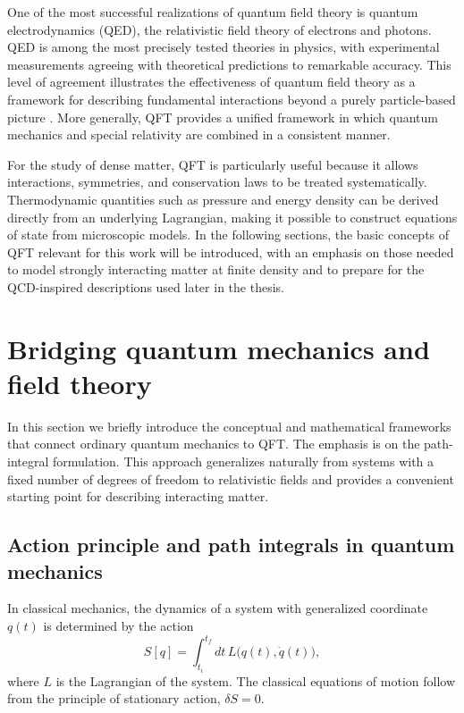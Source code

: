 One of the most successful realizations of quantum field theory is quantum
electrodynamics (QED), the relativistic field theory of electrons and photons.
QED is among the most precisely tested theories in physics, with experimental
measurements agreeing with theoretical predictions to remarkable accuracy.
This level of agreement illustrates the effectiveness of quantum field theory
as a framework for describing fundamental interactions beyond a purely
particle-based picture \cite{PeskinSchroeder1995}. More generally, QFT provides
a unified framework in which quantum mechanics and special relativity are
combined in a consistent manner.

For the study of dense matter, QFT is particularly useful
because it allows interactions, symmetries, and conservation laws to be treated
systematically. Thermodynamic quantities such as pressure and energy density can
be derived directly from an underlying Lagrangian, making it possible to
construct equations of state from microscopic models. In the following
sections, the basic concepts of QFT relevant for this work will
be introduced, with an emphasis on those needed to model strongly interacting
matter at finite density and to prepare for the QCD-inspired descriptions used
later in the thesis.

\section{Bridging quantum mechanics and field theory}
\label{sec:bridging_qm_qft}

In this section we briefly introduce the conceptual and mathematical frameworks
that connect ordinary quantum mechanics to QFT. 
The emphasis is on the path-integral formulation. This approach generalizes
naturally from systems with a fixed number of degrees of freedom to
relativistic fields and provides a convenient starting point for describing
interacting matter.

\subsection*{Action principle and path integrals in quantum mechanics}

In classical mechanics, the dynamics of a system with generalized coordinate
$q(t)$ is determined by the action
\begin{equation}
S[q] = \int_{t_i}^{t_f} \! dt \, L\bigl(q(t), \dot{q}(t)\bigr),
\end{equation}
where $L$ is the Lagrangian of the system. The classical equations of motion
follow from the principle of stationary action, $\delta S = 0$.

